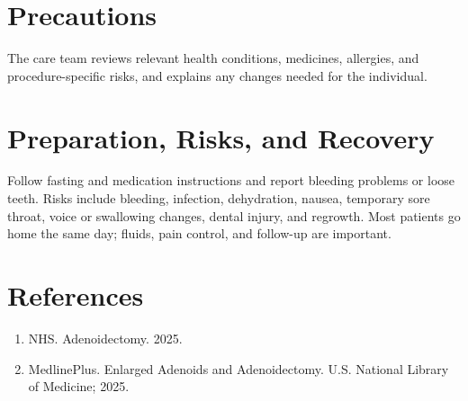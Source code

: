 \section*{Precautions}
The care team reviews relevant health conditions, medicines, allergies, and procedure-specific risks, and explains any changes needed for the individual.

\section*{Preparation, Risks, and Recovery}
Follow fasting and medication instructions and report bleeding problems or loose teeth. Risks include bleeding, infection, dehydration, nausea, temporary sore throat, voice or swallowing changes, dental injury, and regrowth. Most patients go home the same day; fluids, pain control, and follow-up are important.

\section*{References}
\begin{enumerate}
  \item NHS. Adenoidectomy. 2025.
  \item MedlinePlus. Enlarged Adenoids and Adenoidectomy. U.S. National Library of Medicine; 2025.
\end{enumerate}

\clearpage
